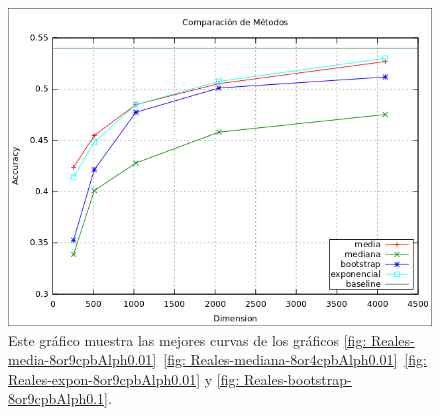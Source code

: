 			\begin{figure}[htbp]
				\centering
				\includegraphics[scale=0.6]{img/resultados/reales/comparativa_metodos.png}
				\caption[Reales - Comparación entre métodos]{Este gráfico muestra las mejores curvas de los gráficos \ref{fig: Reales-media-8or9cpbAlph0.01}~\ref{fig: Reales-mediana-8or4cpbAlph0.01}~\ref{fig: Reales-expon-8or9cpbAlph0.01} y \ref{fig: Reales-bootstrap-8or9cpbAlph0.1}.}
				\label{fig: Reales-Comparativa metodos}
			\end{figure}

\newpage

